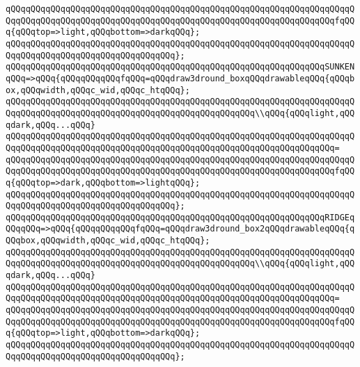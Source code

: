 \verb|qQQqqQQqqQQqqQQqqQQqqQQqqQQqqQQqqQQqqQQqqQQqqQQqqQQqqQQqqQQqqQQqqQQqqQQqqQQqqQQqqQQqqQQqqQQqqQQqqQQqqQQqqQQqqQQqqQQqqQQqqQQqqQQqqQQqqQQqfqQQq{qQQqtop=>light,qQQqbottom=>darkqQQq};|\newline
\verb|qQQqqQQqqQQqqQQqqQQqqQQqqQQqqQQqqQQqqQQqqQQqqQQqqQQqqQQqqQQqqQQqqQQqqQQqqQQqqQQqqQQqqQQqqQQqqQQqqQQqqQQq};|\newline
\newline
\verb|qQQqqQQqqQQqqQQqqQQqqQQqqQQqqQQqqQQqqQQqqQQqqQQqqQQqqQQqqQQqqQQqSUNKENqQQq=>qQQq{qQQqqQQqqQQqfqQQq=qQQqdraw3dround_boxqQQqdrawableqQQq{qQQqbox,qQQqwidth,qQQqc_wid,qQQqc_htqQQq};|\newline
\newline
\verb|qQQqqQQqqQQqqQQqqQQqqQQqqQQqqQQqqQQqqQQqqQQqqQQqqQQqqQQqqQQqqQQqqQQqqQQqqQQqqQQqqQQqqQQqqQQqqQQqqQQqqQQqqQQqqQQqqQQqqQQq\\qQQq{qQQqlight,qQQqdark,qQQq...qQQq}|\newline
\verb|qQQqqQQqqQQqqQQqqQQqqQQqqQQqqQQqqQQqqQQqqQQqqQQqqQQqqQQqqQQqqQQqqQQqqQQqqQQqqQQqqQQqqQQqqQQqqQQqqQQqqQQqqQQqqQQqqQQqqQQqqQQqqQQqqQQqqQQq=|\newline
\verb|qQQqqQQqqQQqqQQqqQQqqQQqqQQqqQQqqQQqqQQqqQQqqQQqqQQqqQQqqQQqqQQqqQQqqQQqqQQqqQQqqQQqqQQqqQQqqQQqqQQqqQQqqQQqqQQqqQQqqQQqqQQqqQQqqQQqqQQqfqQQq{qQQqtop=>dark,qQQqbottom=>lightqQQq};|\newline
\verb|qQQqqQQqqQQqqQQqqQQqqQQqqQQqqQQqqQQqqQQqqQQqqQQqqQQqqQQqqQQqqQQqqQQqqQQqqQQqqQQqqQQqqQQqqQQqqQQqqQQqqQQq};|\newline
\newline
\verb|qQQqqQQqqQQqqQQqqQQqqQQqqQQqqQQqqQQqqQQqqQQqqQQqqQQqqQQqqQQqqQQqRIDGEqQQqqQQq=>qQQq{qQQqqQQqqQQqfqQQq=qQQqdraw3dround_box2qQQqdrawableqQQq{qQQqbox,qQQqwidth,qQQqc_wid,qQQqc_htqQQq};|\newline
\newline
\verb|qQQqqQQqqQQqqQQqqQQqqQQqqQQqqQQqqQQqqQQqqQQqqQQqqQQqqQQqqQQqqQQqqQQqqQQqqQQqqQQqqQQqqQQqqQQqqQQqqQQqqQQqqQQqqQQqqQQqqQQq\\qQQq{qQQqlight,qQQqdark,qQQq...qQQq}|\newline
\verb|qQQqqQQqqQQqqQQqqQQqqQQqqQQqqQQqqQQqqQQqqQQqqQQqqQQqqQQqqQQqqQQqqQQqqQQqqQQqqQQqqQQqqQQqqQQqqQQqqQQqqQQqqQQqqQQqqQQqqQQqqQQqqQQqqQQqqQQq=|\newline
\verb|qQQqqQQqqQQqqQQqqQQqqQQqqQQqqQQqqQQqqQQqqQQqqQQqqQQqqQQqqQQqqQQqqQQqqQQqqQQqqQQqqQQqqQQqqQQqqQQqqQQqqQQqqQQqqQQqqQQqqQQqqQQqqQQqqQQqqQQqfqQQq{qQQqtop=>light,qQQqbottom=>darkqQQq};|\newline
\verb|qQQqqQQqqQQqqQQqqQQqqQQqqQQqqQQqqQQqqQQqqQQqqQQqqQQqqQQqqQQqqQQqqQQqqQQqqQQqqQQqqQQqqQQqqQQqqQQqqQQqqQQq};|\newline

